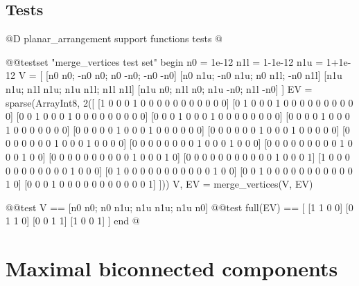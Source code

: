 \documentclass[10pt]{book}
\begin{document}
\subsection{Tests}
@D planar\_arrangement support functions tests
@{@@testset "merge_vertices test set" begin
    n0 = 1e-12
    n1l = 1-1e-12
    n1u = 1+1e-12
    V = [
        [n0 n0; -n0 n0; n0 -n0; -n0 -n0]
        [n0 n1u; -n0 n1u; n0 n1l; -n0 n1l]
        [n1u n1u; n1l n1u; n1u n1l; n1l n1l]
        [n1u n0; n1l n0; n1u -n0; n1l -n0]
    ]
    EV = sparse(Array{Int8, 2}([
        [1 0 0 0 1 0 0 0 0 0 0 0 0 0 0 0]
        [0 1 0 0 0 1 0 0 0 0 0 0 0 0 0 0]
        [0 0 1 0 0 0 1 0 0 0 0 0 0 0 0 0]
        [0 0 0 1 0 0 0 1 0 0 0 0 0 0 0 0]
        [0 0 0 0 1 0 0 0 1 0 0 0 0 0 0 0]
        [0 0 0 0 0 1 0 0 0 1 0 0 0 0 0 0]
        [0 0 0 0 0 0 1 0 0 0 1 0 0 0 0 0]
        [0 0 0 0 0 0 0 1 0 0 0 1 0 0 0 0]
        [0 0 0 0 0 0 0 0 1 0 0 0 1 0 0 0]
        [0 0 0 0 0 0 0 0 0 1 0 0 0 1 0 0]
        [0 0 0 0 0 0 0 0 0 0 1 0 0 0 1 0]
        [0 0 0 0 0 0 0 0 0 0 0 1 0 0 0 1]
        [1 0 0 0 0 0 0 0 0 0 0 0 1 0 0 0]
        [0 1 0 0 0 0 0 0 0 0 0 0 0 1 0 0]
        [0 0 1 0 0 0 0 0 0 0 0 0 0 0 1 0]
        [0 0 0 1 0 0 0 0 0 0 0 0 0 0 0 1]
    ]))
    V, EV = merge_vertices(V, EV)

    @@test V == [n0 n0; n0 n1u; n1u n1u; n1u n0]
    @@test full(EV) == [
        [1 1 0 0]
        [0 1 1 0]
        [0 0 1 1]
        [1 0 0 1]
    ]
end
@}








\section{Maximal biconnected components}
\end{document}
